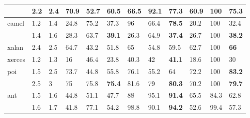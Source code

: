 \begin{table*}[ht!]
\begin{tabular}{l|ll|lll|lll|lll}
                         & 2.2                    & 2.4                   & 70.9 & 52.7 & 60.5                 & 66.5 & 92.1 & \cellcolor{blue!10}\textbf{77.3}           & 60.9 & 100  & \cellcolor{blue!10}\textbf{75.3}              \\ \midrule
\multirow{2}{*}{camel}   & 1.2                    & 1.4                   & 24.8 & 75.2 & 37.3                 & 96   & 66.4 & \cellcolor{blue!10}\textbf{78.5}           & 20.2 & 100  & 32.4              \\
                         & 1.4                    & 1.6                   & 28.3 & 63.7 & \cellcolor{blue!10}\textbf{39.1}                 & 26.3 & 64.9 & \cellcolor{blue!10}\textbf{37.4}           & 26.7 & 100  & \cellcolor{blue!10}\textbf{38.2}              \\ \midrule
xalan                    & 2.4                    & 2.5                   & 64.7 & 43.2 & 51.8                 & 65   & 54.8 & 59.5           & 62.7 & 100  & \cellcolor{blue!10}\textbf{66}                \\ \midrule
xerces                   & 1.2                    & 1.3                   & 16   & 46.4 & 23.8                 & 40.3 & 42   & \cellcolor{blue!10}\textbf{41.1}           & 18.6 & 100  & 30                \\ \midrule
\multirow{2}{*}{poi}     & 1.5                    & 2.5                   & 73.7 & 44.8 & 55.8                 & 76.1 & 55.2 & 64             & 72.2 & 100  & \cellcolor{blue!10}\textbf{83.2}              \\
                         & 2.5                    & 3                     & 75   & 75.8 & \cellcolor{blue!10}\textbf{75.4}                 & 81.6 & 79   & \cellcolor{blue!10}\textbf{80.3}           & 70.2 & 100  & \cellcolor{blue!10}\textbf{79.7}              \\ \midrule
\multirow{2}{*}{ant}     & 1.5                    & 1.6                   & 44.8 & 51.1 & 47.7                 & 88   & 95.1 & \cellcolor{blue!10}\textbf{91.4}           & 65.5 & 84.3 & 62.8              \\
                         & 1.6                    & 1.7                   & 41.8 & 77.1 & 54.2                 & 98.8 & 90.1 & \cellcolor{blue!10}\textbf{94.2}           & 52.6 & 99.4 & 57.3              \\
 \bottomrule
\end{tabular}
\end{table*}
